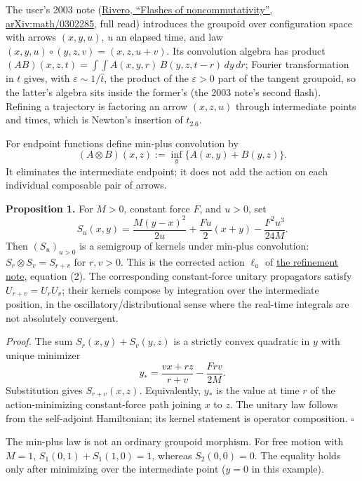 \documentclass[11pt,a4paper]{article}
\begin{document}
The user's 2003 note (\href{https://arxiv.org/abs/math/0302285}{Rivero,
``Flashes of noncommutativity'', arXiv:math/0302285}, full read)
introduces the groupoid over configuration space with arrows
\((x,y,u)\), \(u\) an elapsed time, and law
\((x,y,u)\circ(y,z,v)=(x,z,u+v)\). Its convolution algebra has product
\((AB)(x,z,t)=\int\!\!\int A(x,y,r)\,B(y,z,t-r)\,dy\,dr\); Fourier
transformation in \(t\) gives, with \(\varepsilon\sim1/\hat t\), the
product of the \(\varepsilon>0\) part of the tangent groupoid, so the
latter's algebra sits inside the former's (the 2003 note's second
flash). Refining a trajectory is factoring an arrow \((x,z,u)\) through
intermediate points and times, which is Newton's insertion of
\(t_{2.6}\).

For endpoint functions define min-plus convolution by \[
 (A\otimes B)(x,z):=\inf_y\{A(x,y)+B(y,z)\}.
\] It eliminates the intermediate endpoint; it does not add the action
on each individual composable pair of arrows.

\textbf{Proposition 1.} For \(M>0\), constant force \(F\), and \(u>0\),
set \[S_u(x,y)=\frac{M(y-x)^2}{2u}+\frac{Fu}2(x+y)-\frac{F^2u^3}{24M}.\]
Then \((S_u)_{u>0}\) is a semigroup of kernels under min-plus
convolution: \(S_r\otimes S_v=S_{r+v}\) for \(r,v>0\). This is the
corrected action \(\ell_u\) of
\href{refinement-composition-and-limit.md}{the refinement note},
equation (2). The corresponding constant-force unitary propagators
satisfy \(U_{r+v}=U_rU_v\); their kernels compose by integration over
the intermediate position, in the oscillatory/distributional sense where
the real-time integrals are not absolutely convergent.

\emph{Proof.} The sum \(S_r(x,y)+S_v(y,z)\) is a strictly convex
quadratic in \(y\) with unique minimizer
\[y_*=\frac{vx+rz}{r+v}-\frac{Frv}{2M}.\] Substitution gives
\(S_{r+v}(x,z)\). Equivalently, \(y_*\) is the value at time \(r\) of
the action-minimizing constant-force path joining \(x\) to \(z\). The
unitary law follows from the self-adjoint Hamiltonian; its kernel
statement is operator composition. \(\square\)

The min-plus law is not an ordinary groupoid morphism. For free motion
with \(M=1\), \(S_1(0,1)+S_1(1,0)=1\), whereas \(S_2(0,0)=0\). The
equality holds only after minimizing over the intermediate point
(\(y=0\) in this example).
\end{document}
